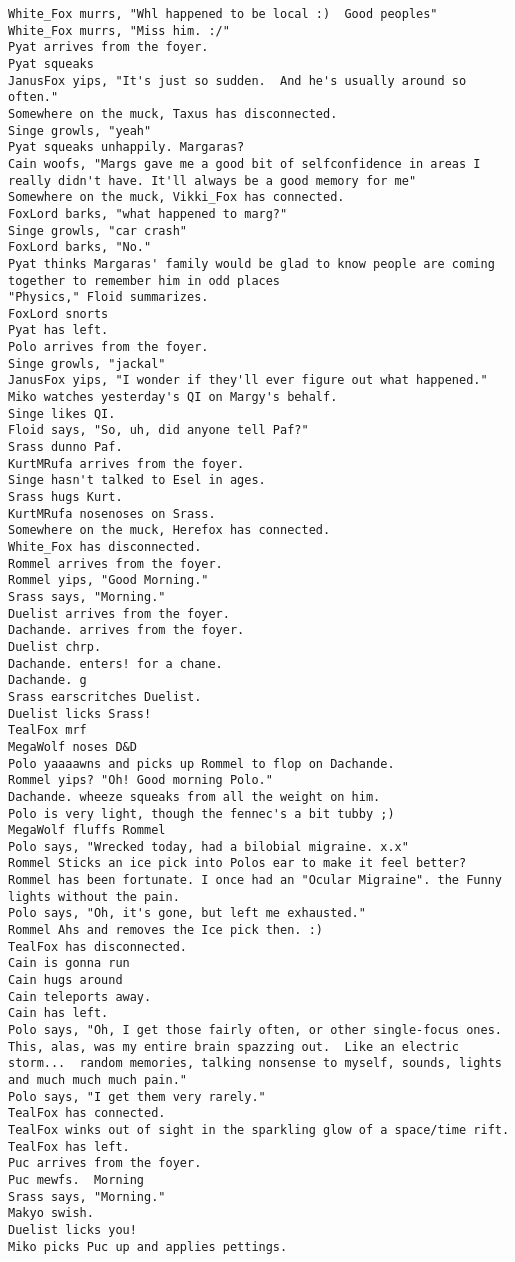 \begin{verbatim}
White_Fox murrs, "Whl happened to be local :)  Good peoples"
White_Fox murrs, "Miss him. :/"
Pyat arrives from the foyer.
Pyat squeaks
JanusFox yips, "It's just so sudden.  And he's usually around so often."
Somewhere on the muck, Taxus has disconnected.
Singe growls, "yeah"
Pyat squeaks unhappily. Margaras?
Cain woofs, "Margs gave me a good bit of selfconfidence in areas I really didn't have. It'll always be a good memory for me"
Somewhere on the muck, Vikki_Fox has connected.
FoxLord barks, "what happened to marg?"
Singe growls, "car crash"
FoxLord barks, "No."
Pyat thinks Margaras' family would be glad to know people are coming together to remember him in odd places
"Physics," Floid summarizes.
FoxLord snorts
Pyat has left.
Polo arrives from the foyer.
Singe growls, "jackal"
JanusFox yips, "I wonder if they'll ever figure out what happened."
Miko watches yesterday's QI on Margy's behalf.
Singe likes QI.
Floid says, "So, uh, did anyone tell Paf?"
Srass dunno Paf.
KurtMRufa arrives from the foyer.
Singe hasn't talked to Esel in ages.
Srass hugs Kurt.
KurtMRufa nosenoses on Srass.
Somewhere on the muck, Herefox has connected.
White_Fox has disconnected.
Rommel arrives from the foyer.
Rommel yips, "Good Morning."
Srass says, "Morning."
Duelist arrives from the foyer.
Dachande. arrives from the foyer.
Duelist chrp.
Dachande. enters! for a chane.
Dachande. g
Srass earscritches Duelist.
Duelist licks Srass!
TealFox mrf
MegaWolf noses D&D
Polo yaaaawns and picks up Rommel to flop on Dachande.
Rommel yips? "Oh! Good morning Polo."
Dachande. wheeze squeaks from all the weight on him.
Polo is very light, though the fennec's a bit tubby ;)
MegaWolf fluffs Rommel
Polo says, "Wrecked today, had a bilobial migraine. x.x"
Rommel Sticks an ice pick into Polos ear to make it feel better?
Rommel has been fortunate. I once had an "Ocular Migraine". the Funny lights without the pain.
Polo says, "Oh, it's gone, but left me exhausted."
Rommel Ahs and removes the Ice pick then. :)
TealFox has disconnected.
Cain is gonna run
Cain hugs around
Cain teleports away.
Cain has left.
Polo says, "Oh, I get those fairly often, or other single-focus ones.  This, alas, was my entire brain spazzing out.  Like an electric storm...  random memories, talking nonsense to myself, sounds, lights and much much much pain."
Polo says, "I get them very rarely."
TealFox has connected.
TealFox winks out of sight in the sparkling glow of a space/time rift.
TealFox has left.
Puc arrives from the foyer.
Puc mewfs.  Morning
Srass says, "Morning."
Makyo swish.
Duelist licks you!
Miko picks Puc up and applies pettings.

\end{verbatim}
